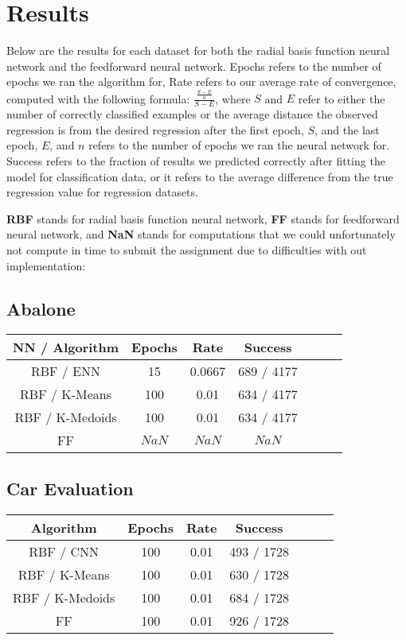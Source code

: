 \documentclass[twoside,11pt]{article}
\begin{document}
\section{Results}
Below are the results for each dataset for both the radial basis function neural network and the feedforward neural network. Epochs refers to the number of epochs we ran the algorithm for, Rate refers to our average rate of convergence, computed with the following formula: $\frac{\frac{S - E}{n}}{S - E} $, where $S$ and $E$ refer to either the number of correctly classified examples or the average distance the observed regression is from the desired regression after the first epoch, $S$, and the last epoch, $E$, and $n$ refers to the number of epochs we ran the neural network for. Success refers to the fraction of results we predicted correctly after fitting the model for classification data, or it refers to the average difference from the true regression value for regression datasets.

\textbf{RBF} stands for radial basis function neural network, \textbf{FF} stands for feedforward neural network, and \textbf{NaN} stands for computations that we could unfortunately not compute in time to submit the assignment due to difficulties with out implementation:
\subsection{Abalone} 

\begin{center}
\begin{tabular}{ |c|c|c|c|c|c|c| }
\hline
NN / Algorithm & Epochs & Rate & Success \\
\hline
RBF / ENN & 15 & 0.0667 & 689 / 4177 \\
\hline
RBF / K-Means & 100 & 0.01 & 634 / 4177 \\
\hline
RBF / K-Medoids & 100 & 0.01 & 634 / 4177 \\
\hline
FF  & $NaN$ & $NaN$ & $NaN$ \\
\hline
\end{tabular}
\end{center}

\subsection{Car Evaluation}
\begin{center}
\begin{tabular}{ |c|c|c|c|c|c|c| }
\hline
Algorithm & Epochs & Rate & Success \\
\hline
RBF / CNN & 100 & 0.01 & 493 / 1728 \\
\hline
RBF / K-Means & 100 & 0.01 & 630 / 1728 \\
\hline
RBF / K-Medoids & 100 & 0.01 & 684 / 1728 \\
\hline
FF & 100 & 0.01 & 926 / 1728 \\
\hline
\end{tabular}
\end{center}
\end{document}
